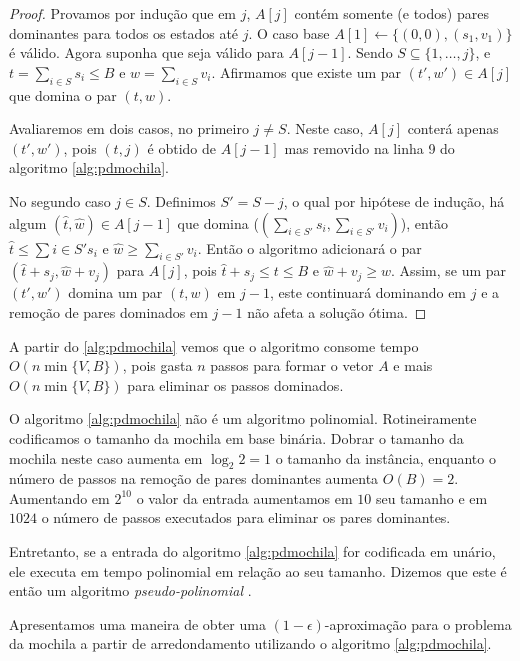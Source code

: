\begin{proof}
Provamos por indução que em $j$, $A[j]$ contém somente (e todos) pares dominantes para todos os estados até $j$. O caso base $A[1] \leftarrow \{(0,0),(s_1,v_1)\}$ é válido. Agora suponha que seja válido para $A[j-1]$. Sendo $S \subseteq \{1, \ldots, j\}$, e $t=\sum_{i \in S} s_i \leq B$ e $w = \sum_{i \in S} v_i$. Afirmamos que existe um par $(t',w') \in A[j]$ que domina o par $(t,w)$.

Avaliaremos em dois casos, no primeiro $j \neq S$. Neste caso, $A[j]$ conterá apenas $(t',w')$, pois $(t,j)$ é obtido de $A[j-1]$ mas removido na linha 9 do algoritmo \ref{alg:pdmochila}.

No segundo caso $j \in S$. Definimos $S' = S - {j}$, o qual por hipótese de indução, há algum $(\hat{t},\hat{w}) \in A[j-1]$ que domina ($\left(\sum_{i \in S'} s_i,\sum_{i \in S'} v_i\right)$), então $\hat{t} \leq \sum{i \in S'} s_i$ e $\hat{w} \geq \sum_{i \in S'} v_i$. Então o algoritmo adicionará o par $\left(\hat{t} + s_j, \hat{w} + v_j \right)$ para $A[j]$, pois $\hat{t} + s_j \leq t \leq B$ e $\hat{w} + v_j \geq w$. Assim, se um par $(t',w')$ domina um par $(t,w)$ em $j-1$, este continuará dominando em $j$ e a remoção de pares dominados em $j-1$ não afeta a solução ótima.

\end{proof}

A partir do \ref{alg:pdmochila} vemos que o algoritmo consome tempo $O(n \min\{V,B\})$, pois gasta $n$ passos para formar o vetor $A$ e mais $O(n \min\{V,B\})$ para eliminar os passos dominados.

O algoritmo \ref{alg:pdmochila} não é um algoritmo polinomial. Rotineiramente codificamos o tamanho da mochila em base binária. Dobrar o tamanho da mochila neste caso aumenta em $\log_2 2 = 1$ o tamanho da instância, enquanto o número de passos na remoção de pares dominantes aumenta $O(B) = 2$. Aumentando em $2^{10}$ o valor da entrada aumentamos em $10$ seu tamanho e em $1024$ o número de passos executados para eliminar os pares dominantes.

Entretanto, se a entrada do algoritmo \ref{alg:pdmochila} for codificada em unário, ele executa em tempo polinomial em relação ao seu tamanho. Dizemos que este é então um algoritmo \textit{pseudo-polinomial} \cite{Williamson}.

Apresentamos uma maneira de obter uma $(1 - \epsilon)$-aproximação para o problema da mochila a partir de arredondamento utilizando o algoritmo \ref{alg:pdmochila}.

